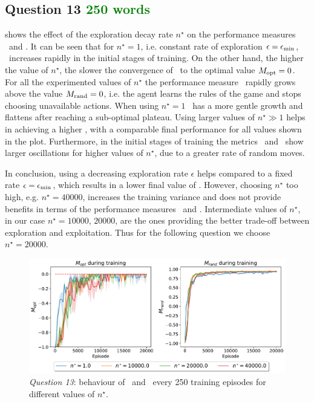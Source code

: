 \documentclass[10pt]{IEEEtran}
\begin{document}
\subsection*{Question 13  \textcolor{Green}{250 words}}
 shows the effect of the exploration decay rate $n^{\star}$ on the performance measures \mopt\  and \mrand.
It can be seen that for $n^{\star} = 1$, i.e. constant rate of exploration $\epsilon = \epsilon_{\text{min}}$, \mopt\ increases rapidly in the initial stages of training. On the other hand, the higher the value of $n^{\star}$, the slower the convergence of \mopt\ to the optimal value $M_{\text{opt}} = 0$. 
For all the experimented values of $n^{\star}$ the performance measure \mrand\ rapidly grows above the value $M_{\text{rand}} = 0$, i.e. the agent learns the rules of the game and stops choosing unavailable actions. When using $n^{\star} = 1$ \mrand\ has a more gentle growth and flattens after reaching a sub-optimal plateau. Using larger values of $n^{\star} \gg 1$ helps in achieving a higher \mrand, with a comparable final performance for all values shown in the plot.
Furthermore, in the initial stages of training the metrics \mopt\ and \mrand\ show larger oscillations for higher values of $n^{\star}$, due to a greater rate of random moves.

In conclusion, using a decreasing exploration rate $\epsilon$ helps compared to a fixed rate $\epsilon = \epsilon_{\text{min}}$, which results in a lower final value of \mrand. However, choosing $n^{\star}$ too high, e.g. $n^{\star} = 40000$, increases the training variance and does not provide benefits in terms of the performance measures \mopt\ and \mrand. Intermediate values of $n^{\star}$, in our case $n^{\star}=10000,\,20000$, are the ones providing the better trade-off between exploration and exploitation. Thus for the following question we choose $n^{\star} = 20000$.

\begin{figure}[h]
    \centering
    \includegraphics[width = \linewidth]{code/figures/performance_dqn_n_star.pdf}
    \caption{\emph{Question 13}: behaviour of \mopt\  and \mrand\  every 250 training episodes for different values of $n^{\star}$.}
    \label{plot_question13}
\end{figure}
\end{document}
